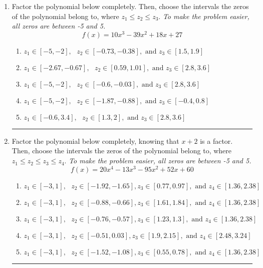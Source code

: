 \documentclass[14pt]{extbook}
\newcommand{\litem}[1]{\item#1\hspace*{-1cm}\rule{\textwidth}{0.4pt}}
\begin{document}
\begin{enumerate}
{\begin{enumerate}[label=\Alph*.]
\end{enumerate} }
\litem{
Factor the polynomial below completely. Then, choose the intervals the zeros of the polynomial belong to, where $z_1 \leq z_2 \leq z_3$. \textit{To make the problem easier, all zeros are between -5 and 5.}\[ f(x) = 10x^{3} -39 x^{2} +18 x + 27 \]\begin{enumerate}[label=\Alph*.]
\item \( z_1 \in [-5, -2], \text{   }  z_2 \in [-0.73, -0.38], \text{   and   } z_3 \in [1.5, 1.9] \)
\item \( z_1 \in [-2.67, -0.67], \text{   }  z_2 \in [0.59, 1.01], \text{   and   } z_3 \in [2.8, 3.6] \)
\item \( z_1 \in [-5, -2], \text{   }  z_2 \in [-0.6, -0.03], \text{   and   } z_3 \in [2.8, 3.6] \)
\item \( z_1 \in [-5, -2], \text{   }  z_2 \in [-1.87, -0.88], \text{   and   } z_3 \in [-0.4, 0.8] \)
\item \( z_1 \in [-0.6, 3.4], \text{   }  z_2 \in [1.3, 2], \text{   and   } z_3 \in [2.8, 3.6] \)

\end{enumerate} }
\litem{
Factor the polynomial below completely, knowing that $x+2$ is a factor. Then, choose the intervals the zeros of the polynomial belong to, where $z_1 \leq z_2 \leq z_3 \leq z_4$. \textit{To make the problem easier, all zeros are between -5 and 5.}\[ f(x) = 20x^{4} -13 x^{3} -95 x^{2} +52 x + 60 \]\begin{enumerate}[label=\Alph*.]
\item \( z_1 \in [-3, 1], \text{   }  z_2 \in [-1.92, -1.65], z_3 \in [0.77, 0.97], \text{   and   } z_4 \in [1.36, 2.38] \)
\item \( z_1 \in [-3, 1], \text{   }  z_2 \in [-0.88, -0.66], z_3 \in [1.61, 1.84], \text{   and   } z_4 \in [1.36, 2.38] \)
\item \( z_1 \in [-3, 1], \text{   }  z_2 \in [-0.76, -0.57], z_3 \in [1.23, 1.3], \text{   and   } z_4 \in [1.36, 2.38] \)
\item \( z_1 \in [-3, 1], \text{   }  z_2 \in [-0.51, 0.03], z_3 \in [1.9, 2.15], \text{   and   } z_4 \in [2.48, 3.24] \)
\item \( z_1 \in [-3, 1], \text{   }  z_2 \in [-1.52, -1.08], z_3 \in [0.55, 0.78], \text{   and   } z_4 \in [1.36, 2.38] \)


\end{enumerate}}
\end{enumerate}
\end{document}
